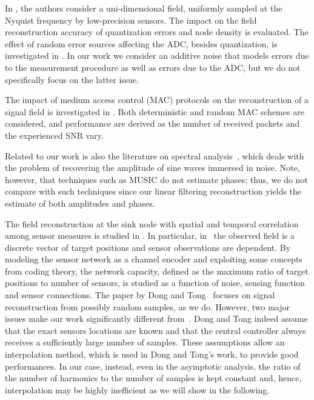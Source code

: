 \documentclass[final, a4paper]{IEEEtran}
\begin{document}
In \cite{Kumar03}, the authors consider a uni-dimensional field, uniformly sampled at the
Nyquist frequency by low-precision sensors. The impact on the
field reconstruction accuracy of quantization errors
and node density is evaluated.
The effect of random error sources affecting the ADC, besides quantization,
is investigated in \cite{Ergen06}.
In our work we consider an additive noise that models errors due to the measurement
procedure as well as errors due to the ADC, but we do not specifically focus
on the latter issue.

The impact of medium access control (MAC) protocols on
the reconstruction of a signal field is investigated in \cite{Dong04}.
Both deterministic and random MAC schemes are considered,
and performance are derived as the number of received packets and
the experienced SNR vary.

Related to our work is also the literature on
spectral analysis~\cite{Maravic, Stoica}, which
deals with the problem of recovering the amplitude of sine waves
immersed in noise.
Note, however, that techniques such as MUSIC do not estimate phases; thus,
we do not compare with such techniques since our linear filtering reconstruction yields the
estimate of both amplitudes and phases.

The field reconstruction at the sink node with spatial and
temporal correlation among sensor measures is studied in
\cite{CristescuVetterli,Poor,Vuran04,Rachlin1}.
In particular, in~\cite{Rachlin1} the observed field is a discrete vector of
target positions and sensor observations are dependent. By modeling
the sensor network as a channel encoder and exploiting some concepts
from coding theory, the network capacity,
defined as the maximum ratio of target positions to number of sensors,
is studied as a function of noise, sensing function and sensor connections.
The paper by Dong and Tong~\cite{DongTong} focuses on signal reconstruction from possibly random
samples, as we do. However, two major issues make our work significantly
different from~\cite{DongTong}. Dong and Tong indeed assume that the exact
sensors locations are  known and that the central controller
always receives a sufficiently large number of samples. These assumptions allow
an interpolation method, which is used in  Dong and Tong's work,
to provide good performances. In our case, instead, even
in the asymptotic analysis, the ratio of the number of harmonics
to the number of samples is kept constant and, hence, interpolation
may be highly inefficient as we will show in the following.
\end{document}
